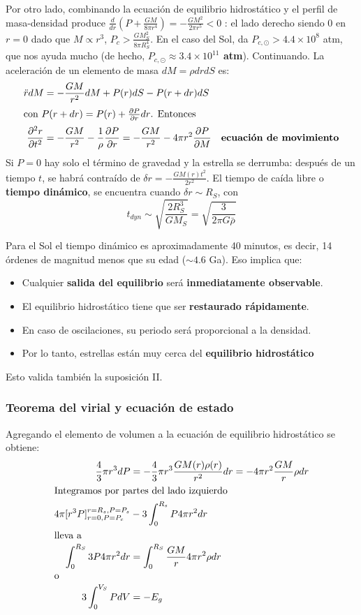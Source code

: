 \documentclass[11pt,letterpaper]{article}
\begin{document}
Por otro lado, combinando la ecuación de equilibrio hidrostático y el perfil de masa-densidad produce $\frac{d}{dr}(P+\frac{GM}{8\pi r^4}) = -\frac{GM^2}{2\pi r^5} < 0$ : el lado derecho siendo 0 en $r = 0$ dado que $M \propto r^3$, $P_c>\frac{GM^2_S}{8\pi R^4_S}$. En el caso del Sol, da $P_{c, \odot} > 4.4 \times 10^{8}$ atm, que nos ayuda mucho (de hecho, \textbf{$P_{c,\odot}\approx 3.4 \times 10^{11}$ atm}).
Continuando. La aceleración de un elemento de masa $dM = \rho dr dS$ es:
\begin{align}
    \ddot{r} dM &= - \frac{GM}{r^2}dM + P(r) dS - P(r + dr)dS \\
    \intertext{con $P(r+dr) = P(r)+\frac{\partial P}{\partial r}dr$. Entonces}
    \frac{\partial ^2 r}{\partial t^2} &= -\frac{GM}{r^2} - \frac{1}{\rho}\frac{\partial P}{\partial r} = -\frac{GM}{r^2} - 4\pi r^2 \frac{\partial P}{\partial M} \quad \text{\textbf{ecuación de movimiento}} 
\end{align}  
Si $P = 0$ hay solo el término de gravedad y la estrella se derrumba: después de un tiempo $t$, se habrá contraído de $\delta r = - \frac{GM(r)t^2}{2r^2}$. El tiempo de caída libre o \textbf{tiempo dinámico}, se encuentra cuando $\delta r \sim R_S$, con 
\begin{equation}
    t_{dyn} \sim \sqrt{\frac{2R_S^3}{GM_S}} = \sqrt{\frac{3}{2\pi G \bar{\rho}}}
\end{equation}

Para el Sol el tiempo dinámico es aproximadamente 40 minutos, es decir, 14 órdenes de magnitud menos que su edad ($\sim 4.6$ Ga). Eso implica que:
    \begin{itemize}
        \item Cualquier \textbf{salida del equilibrio} será \textbf{inmediatamente observable}.
        \item El equilibrio hidrostático tiene que ser \textbf{restaurado rápidamente}.
        \item En caso de oscilaciones, su periodo será proporcional a la densidad.
        \item Por lo tanto, estrellas están muy cerca del \textbf{equilibrio hidrostático}
    \end{itemize}
Esto valida también la suposición II.
\subsubsection{Teorema del virial y ecuación de estado}
Agregando el elemento de volumen a la ecuación de equilibrio hidrostático se obtiene:
\begin{align}
    \frac{4}{3} \pi r^3 dP &= -\frac{4}{3}\pi r^3 \frac{GM(r)\rho (r)}{r^2}dr = -4\pi r^2 \frac{GM}{r} \rho dr \\
    \intertext{Integramos por partes del lado izquierdo}
    4\pi [r^3P]_{r=0, P = P_c}^{r=R_s, P = P_s} &-3 \int _0^{R_s} P4\pi r^2 dr \\
    \intertext{lleva a}
    \int _0 ^{R_S} 3P4 \pi r^2 dr &= \int _0 ^{R_S} \frac{GM}{r} 4 \pi r^2 \rho dr \\
    \intertext{o}
    3 \int _0 ^{V_S} PdV &= -E_g
\end{align}
\end{document}
